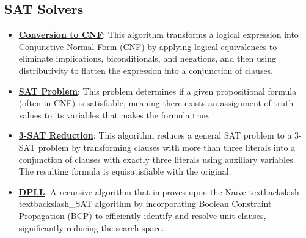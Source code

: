 \documentclass{article}%
\begin{document}
\subsection{SAT Solvers}%
\label{subsec:SATSolvers}%
\begin{itemize}[leftmargin=*]%
\item \href{https://purdue.brightspace.com/d2l/common/assets/pdfjs-d2l-dist/1.0.14-legacy/web/viewer.html?file=\%2Fcontent\%2Fenforced\%2F1095467-wl.202510.CS.24300.001\%2F13L1-Logic.pdf\%3Fou\%3D1095467\&lang=en-us\&container=d2l-fileviewer-rendered-pdf\&fullscreen=d2l-fileviewer-rendered-pdf-dialog\&height=667#page=17}{\textbf{Conversion to CNF}}: This algorithm transforms a logical expression into Conjunctive Normal Form (CNF) by applying logical equivalences to eliminate implications, biconditionals, and negations, and then using distributivity to flatten the expression into a conjunction of clauses.%
\item \href{https://purdue.brightspace.com/d2l/common/assets/pdfjs-d2l-dist/1.0.14-legacy/web/viewer.html?file=\%2Fcontent\%2Fenforced\%2F1095467-wl.202510.CS.24300.001\%2F13L1-Logic.pdf\%3Fou\%3D1095467\&lang=en-us\&container=d2l-fileviewer-rendered-pdf\&fullscreen=d2l-fileviewer-rendered-pdf-dialog\&height=667#page=15}{\textbf{SAT Problem}}: This problem determines if a given propositional formula (often in CNF) is satisfiable, meaning there exists an assignment of truth values to its variables that makes the formula true.%
\item \href{https://purdue.brightspace.com/d2l/common/assets/pdfjs-d2l-dist/1.0.14-legacy/web/viewer.html?file=\%2Fcontent\%2Fenforced\%2F1095467-wl.202510.CS.24300.001\%2F13L1-Logic.pdf\%3Fou\%3D1095467\&lang=en-us\&container=d2l-fileviewer-rendered-pdf\&fullscreen=d2l-fileviewer-rendered-pdf-dialog\&height=667#page=24}{\textbf{3-SAT Reduction}}: This algorithm reduces a general SAT problem to a 3-SAT problem by transforming clauses with more than three literals into a conjunction of clauses with exactly three literals using auxiliary variables. The resulting formula is equisatisfiable with the original.%
\item \href{https://purdue.brightspace.com/d2l/common/assets/pdfjs-d2l-dist/1.0.14-legacy/web/viewer.html?file=\%2Fcontent\%2Fenforced\%2F1095467-wl.202510.CS.24300.001\%2F15L2-SAT.pdf\%3Fou\%3D1095467\&lang=en-us\&container=d2l-fileviewer-rendered-pdf\&fullscreen=d2l-fileviewer-rendered-pdf-dialog\&height=667#page=17}{\textbf{DPLL}}: A recursive algorithm that improves upon the Naïve textbackslash{} textbackslash{}_SAT algorithm by incorporating Boolean Constraint Propagation (BCP) to efficiently identify and resolve unit clauses, significantly reducing the search space.%

\end{itemize}
\end{document}
